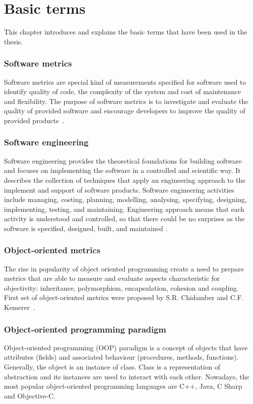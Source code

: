 \chapter{Basic terms} \label{roz:basic_terms}

This chapter introduces and explains the basic terms that have been used in the thesis.

\subsection*{Software metrics}
Software metrics are special kind of measurements specified for software used to identify quality of code, the complexity of the system and cost of maintenance and flexibility. The purpose of software metrics is to investigate and evaluate the quality of provided software and encourage developers to improve the quality of provided products~\cite{metrics}.

\subsection*{Software engineering}
Software engineering provides the theoretical foundations for building software and focuses on implementing the software in a controlled and scientific way.  It describes the collection of techniques that apply an engineering approach to the implement and support of software products. Software engineering activities include managing, costing, planning, modelling, analysing, specifying,  designing, implementing, testing, and maintaining. Engineering approach means that each activity is understood and controlled, so that there could be no surprises as the software is specified, designed, built, and maintained \cite{rigorous}.

\subsection*{Object-oriented metrics}
The rise in popularity of object oriented programming create a need to prepare metrics that are able to measure and evaluate aspects characteristic for objectivity: inheritance, polymorphism, encapsulation, cohesion and coupling. First set of object-oriented metrics were proposed by S.R. Chidamber and C.F. Kemerer~\cite{alain}.

\subsection*{Object-oriented programming paradigm}
Object-oriented programming (OOP) paradigm is a concept of objects that have attributes (fields) and associated behaviour (procedures, methods, functions). Generally, the object is an instance of class. Class is a representation of abstraction and its instances are used to interact with each other. Nowadays, the most popular object-oriented programming languages are C++, Java, C Sharp  and Objective-C.  

